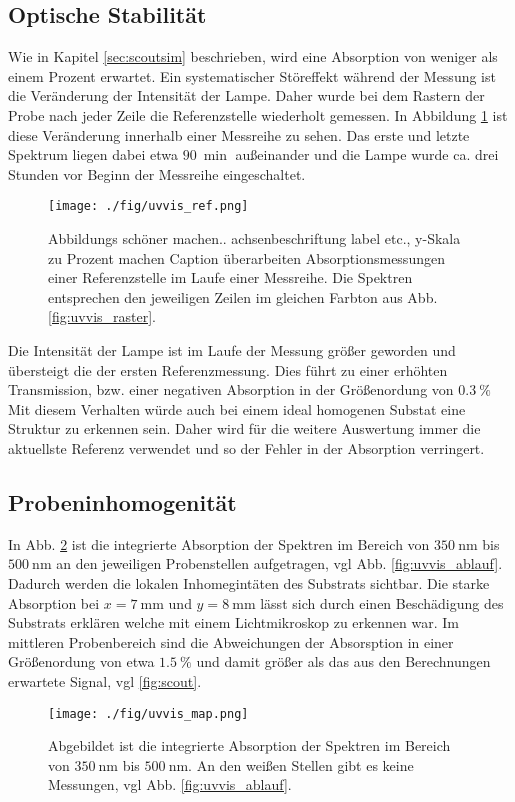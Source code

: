 \subsection{Optische Stabilität}
Wie in Kapitel \ref{sec:scoutsim} beschrieben, wird eine Absorption von weniger als einem Prozent erwartet.
Ein systematischer Störeffekt während der Messung ist die Veränderung der Intensität der Lampe.
Daher wurde bei dem Rastern der Probe nach jeder Zeile die Referenzstelle wiederholt gemessen.
In Abbildung \ref{fig:uvvis_ref} ist diese Veränderung innerhalb einer Messreihe zu sehen.
Das erste und letzte Spektrum liegen dabei etwa $\SI{90}{\min}$ außeinander und die Lampe wurde ca. drei Stunden vor Beginn der Messreihe eingeschaltet.
\begin{figure}
    \centering
    \texttt{[image: ./fig/uvvis\_ref.png]}
    \caption{Abbildungs schöner machen.. achsenbeschriftung label etc., y-Skala zu Prozent machen Caption überarbeiten
    Absorptionsmessungen einer Referenzstelle im Laufe einer Messreihe.
    Die Spektren entsprechen den jeweiligen Zeilen im gleichen Farbton aus Abb. \ref{fig:uvvis_raster}.}
    \label{fig:uvvis_ref}
\end{figure}
Die Intensität der Lampe ist im Laufe der Messung größer geworden und übersteigt die der ersten Referenzmessung. 
Dies führt zu einer erhöhten Transmission, bzw. einer negativen Absorption in der Größenordung von $\SI{0.3}{\%}$
Mit diesem Verhalten würde auch bei einem ideal homogenen Substat eine Struktur zu erkennen sein.
Daher wird für die weitere Auswertung immer die aktuellste Referenz verwendet und so der Fehler in der Absorption verringert.
\subsection{Probeninhomogenität}
In Abb. \ref{fig:uvvis_map} ist die integrierte Absorption der Spektren im Bereich von $\SI{350}{\nm}$ bis $\SI{500}{\nm}$ an den jeweiligen Probenstellen aufgetragen, vgl Abb. \ref{fig:uvvis_ablauf}.
Dadurch werden die lokalen Inhomegintäten des Substrats sichtbar.
Die starke Absorption bei $x=\SI{7}{\mm}$ und $y=\SI{8}{\mm}$ lässt sich durch einen Beschädigung des Substrats erklären welche mit einem Lichtmikroskop zu erkennen war.
Im mittleren Probenbereich sind die Abweichungen der Absorsption in einer Größenordung von etwa $\SI{1.5}{\%}$ und damit größer als das aus den Berechnungen erwartete Signal, vgl \ref{fig:scout}.
\begin{figure}
    \centering
    \texttt{[image: ./fig/uvvis\_map.png]}
    \caption{Abgebildet ist die integrierte Absorption der Spektren im Bereich von $\SI{350}{\nm}$ bis $\SI{500}{\nm}$. An den weißen Stellen gibt es keine Messungen, vgl Abb. \ref{fig:uvvis_ablauf}.}
    \label{fig:uvvis_map}
\end{figure}

